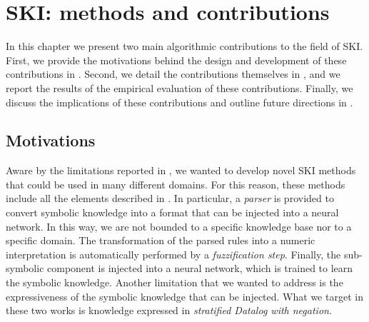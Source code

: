 
\chapter{SKI: methods and contributions}
\label{ch:ski-methods-and-contributions}
\mtcaddchapter
\minitoc

In this chapter we present two main algorithmic contributions to the field of \gls{SKI}.
%
First, we provide the motivations behind the design and development of these contributions in .
%
Second, we detail the contributions themselves in , and we report the results of the empirical evaluation of these contributions.
%
Finally, we discuss the implications of these contributions and outline future directions in .


\section{Motivations}\label{sec:ski-motivations}
%
Aware by the limitations reported in , we wanted to develop novel \gls{SKI} methods that could be used in many different domains.
%
For this reason, these methods include all the elements described in .
%
In particular, a \emph{parser} is provided to convert symbolic knowledge into a format that can be injected into a neural network.
%
In this way, we are not bounded to a specific knowledge base nor to a specific domain.
%
The transformation of the parsed rules into a numeric interpretation is automatically performed by a \emph{fuzzification step}.
%
Finally, the sub-symbolic component is injected into a neural network, which is trained to learn the symbolic knowledge.
%
Another limitation that we wanted to address is the expressiveness of the symbolic knowledge that can be injected.
%
What we target in these two works is knowledge expressed in \emph{stratified Datalog with negation}.


